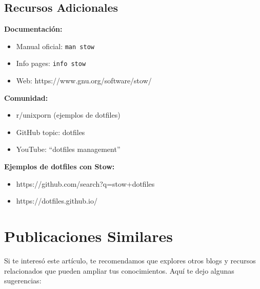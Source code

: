 \documentclass[
  doc,
  floatsintext,
  longtable,
  a4paper,
  nolmodern,
  notxfonts,
  notimes,
  12pt,
  colorlinks=true,linkcolor=blue,citecolor=blue,urlcolor=blue]{apa7}
\providecommand{\tightlist}{%
  \setlength{\itemsep}{0pt}\setlength{\parskip}{0pt}}
\begin{document}
\subsection{Recursos Adicionales}\label{recursos-adicionales}

\textbf{Documentación:}

\begin{itemize}
\tightlist
\item
  Manual oficial: \texttt{man\ stow}
\item
  Info pages: \texttt{info\ stow}
\item
  Web: https://www.gnu.org/software/stow/
\end{itemize}

\textbf{Comunidad:}

\begin{itemize}
\tightlist
\item
  r/unixporn (ejemplos de dotfiles)
\item
  GitHub topic: dotfiles
\item
  YouTube: ``dotfiles management''
\end{itemize}

\textbf{Ejemplos de dotfiles con Stow:}

\begin{itemize}
\tightlist
\item
  https://github.com/search?q=stow+dotfiles
\item
  https://dotfiles.github.io/
\end{itemize}

\section{Publicaciones Similares}\label{publicaciones-similares}

Si te interesó este artículo, te recomendamos que explores otros blogs y
recursos relacionados que pueden ampliar tus conocimientos. Aquí te dejo
algunas sugerencias:
\end{document}
